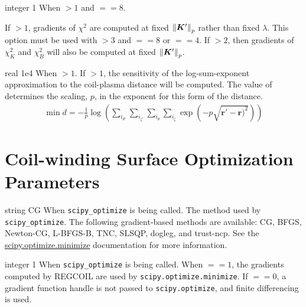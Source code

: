 \myhrule

{integer}
{1}
{When  $> 1$ and  $ == 8$.}
{If  $> 1$, gradients of $\chi^2$ are computed at fixed $\norm{\bm{K}'}_p$ rather than fixed $\lambda$. This option must be used with  $> 3$ and   $ == 8$ or  $ == 4$. If  $ >2$, then gradients of $\chi^2_K$ and $\chi^2_B$ will also be computed at fixed $\norm{\bm{K}'}_p$. 

}

\myhrule

{real}
{1e4}
{When  $> 1$.}
{If  $>1$, the sensitivity of the log-sum-exponent approximation to the coil-plasma distance will be computed. The value of  determines the scaling, $p$, in the exponent for this form of the distance.
\begin{gather}
\min d = - \frac{1}{p} \log \left( \sum_{i_{\theta'}} \sum_{i_{\zeta'}} \sum_{i_{\theta}} \sum_{i_{\zeta}} \exp \left( - p \sqrt{ \bm{r}' - \bm{r})^2} \right) \right)
\end{gather}
}

\myhrule

\section{Coil-winding Surface Optimization Parameters}

\myhrule

{string}
{CG}
{When \texttt{scipy\_optimize} is being called.}
{The method used by \texttt{scipy\_optimize}. The following gradient-based methods are available: CG, BFGS, Newton-CG, L-BFGS-B, TNC, SLSQP, dogleg, and trust-ncp. See the \\
\href{https://docs.scipy.org/doc/scipy/reference/generated/scipy.optimize.minimize.html}{scipy.optimize.minimize} documentation for more information.}

\myhrule

{integer}
{1}
{When \texttt{scipy\_optimize} is being called.}
{When  $ == 1$, the gradients computed by REGCOIL are used by \texttt{scipy.optimize.minimize}. If  $ == 0$, a gradient function handle is not passed to \texttt{scipy.optimize}, and finite differencing is used.}

